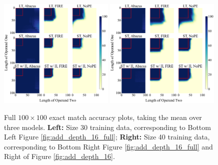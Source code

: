 \documentclass{article}
\begin{document}
\begin{figure}[ht!]
    \centering
    \includegraphics[width=0.49\textwidth]{Figures/grids/grids_plot_two.pdf}
    \includegraphics[width=0.49\textwidth]{Figures/grids/grids_plot_three.pdf}
    \caption{
    Full $100\times 100$ exact match accuracy plots, taking the mean over three models.
    \textbf{Left:} Size 30 training data, corresponding to Bottom Left Figure \ref{fig:add_depth_16_full}; \textbf{Right:} Size 40 training data, corresponding to Bottom Right Figure \ref{fig:add_depth_16_full} and Right of Figure \ref{fig:add_depth_16}.
    }
    \label{fig:app_grid_30_40}
\end{figure}
\end{document}
